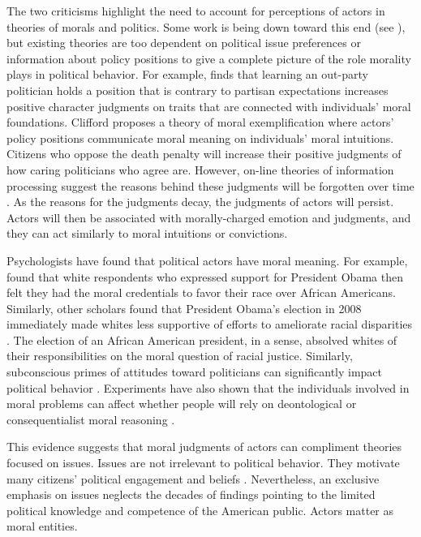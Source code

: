 The two criticisms highlight the need to account for perceptions of actors in theories of morals and politics. Some work is being down toward this end (see ), but existing theories are too dependent on political issue preferences or information about policy positions to give a complete picture of the role morality plays in political behavior. For example,  finds that learning an out-party politician holds a position that is contrary to partisan expectations increases positive character judgments on traits that are connected with individuals' moral foundations. Clifford proposes a theory of moral exemplification where actors' policy positions communicate moral meaning on individuals' moral intuitions. Citizens who oppose the death penalty will increase their positive judgments of how caring politicians who agree are. However, on-line theories of information processing suggest the reasons behind these judgments will be forgotten over time \cite{LodgeMcGrawStroh1989,LodgeSteenbergenBrau1995}. As the reasons for the judgments decay, the judgments of actors will persist. Actors will then be associated with morally-charged emotion and judgments, and they can act similarly to moral intuitions or convictions.

Psychologists have found that political actors have moral meaning. For example,  found that white respondents who expressed support for President Obama then felt they had the moral credentials to favor their race over African Americans. Similarly, other scholars found that President Obama's election in 2008 immediately made whites less supportive of efforts to ameliorate racial disparities \cite{Kaiseretal2009}. The election of an African American president, in a sense, absolved whites of their responsibilities on the moral question of racial justice. Similarly, subconscious primes of attitudes toward politicians can significantly impact political behavior \cite{WeinbergerWesten2008}. Experiments have also shown that the individuals involved in moral problems can affect whether people will rely on deontological or consequentialist moral reasoning \cite{Edmonds2013,Uhlmannetal2009}.

This evidence suggests that moral judgments of actors can compliment theories focused on issues. Issues are not irrelevant to political behavior. They motivate many citizens' political engagement and beliefs \cite{Ansolabehereetal2008}. Nevertheless, an exclusive emphasis on issues neglects the decades of findings pointing to the limited political knowledge \cite{DelliCarpiniKeeter1996} and competence of the American public. Actors matter as moral entities.


%
%
%
%
%
%
% 